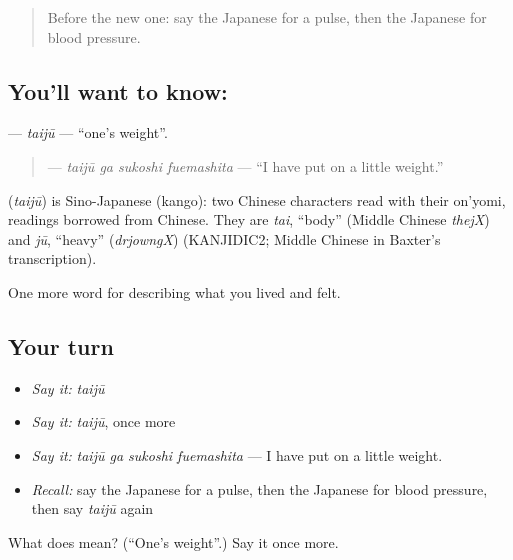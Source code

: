 \begin{quote}
Before the new one: say the Japanese for a pulse, then the Japanese for blood pressure.
\end{quote}

\subsection*{You'll want to know: }
\textbf{} — \emph{taijū} — \textquotedblleft{}one's weight\textquotedblright{}.

\begin{quote}
\textbf{  } — \emph{taijū ga sukoshi fuemashita} — \textquotedblleft{}I have put on a little weight.\textquotedblright{}
\end{quote}

\begin{cousinweb}
\textbf{} (\emph{taijū}) is Sino-Japanese (kango): two Chinese characters read with their on'yomi, readings borrowed from Chinese. They are \emph{tai}, \textquotedblleft{}body\textquotedblright{} (Middle Chinese \emph{thejX}) and \emph{jū}, \textquotedblleft{}heavy\textquotedblright{} (\emph{drjowngX}) (KANJIDIC2; Middle Chinese in Baxter's transcription).
\end{cousinweb}

\begin{grammarlens}[title={What you've built}]
One more word for describing what you lived and felt.
\end{grammarlens}

\subsection*{Your turn}
\begin{itemize}
\raggedright
  \item \emph{Say it:} \emph{taijū}
  \item \emph{Say it:} \emph{taijū}, once more
  \item \emph{Say it:} \emph{taijū ga sukoshi fuemashita} — I have put on a little weight.
  \item \emph{Recall:} say the Japanese for a pulse, then the Japanese for blood pressure, then say \emph{taijū} again
\end{itemize}

\begin{tcolorbox}[breakable,colback=teal!4,colframe=teal!35!black,title={Before you move on}]
What does  mean? (\textquotedblleft{}One's weight\textquotedblright{}.) Say it once more.
\end{tcolorbox}
